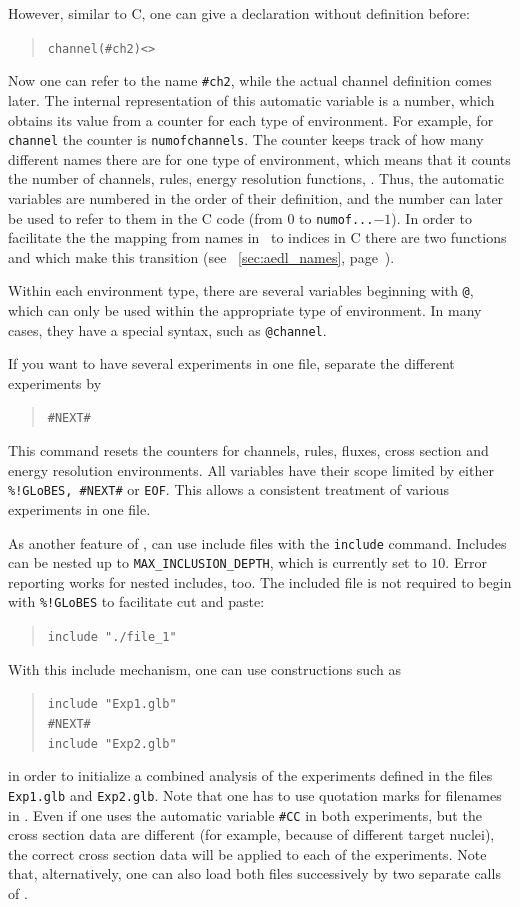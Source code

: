 However, similar to C, one can give a declaration without definition before:
\begin{quote}
{\tt    channel(\#ch2)<>}
\end{quote}
Now one can refer to the name {\tt \#ch2}, while the actual channel definition comes later. The internal representation of this automatic
variable is a number, which obtains its value from a counter for each type of environment. For example, for {\tt channel} the counter is {\tt numofchannels}. The counter keeps track of how many different names 
there are for one type of environment, which means that it counts the number of channels, rules, energy resolution functions, \etc . Thus, the automatic
variables are numbered in the order of their definition, and the number
can later be used to refer to them in the C code (from $0$ to {\tt numof...}$-1$). In order to facilitate the the mapping from names in \AEDL\ to indices
in C there are two functions  and  which
make this transition (see \Sec~\ref{sec:aedl_names}, 
page~\pageref{sec:aedl_names}).


Within each environment type, there are several 
variables beginning with {\tt @}, which can only be used within the 
appropriate type of environment. In many cases, 
they have a special syntax, such as {\tt @channel}.

If you want to have several experiments in one file, separate the different
 experiments by 
\begin{quote}
{\tt    \#NEXT\#}
\end{quote}
This command resets the counters for channels, rules, fluxes, cross section 
and energy resolution environments. All variables have their scope limited 
by either {\tt \%!GLoBES, \#NEXT\#} or {\tt EOF}.  This allows 
a consistent treatment of various experiments in one file.

As another feature of \AEDL , can use include files with the {\tt include} command. Includes can be nested up to {\tt MAX\_INCLUSION\_DEPTH}, which is currently set to $10$. Error reporting works 
 for nested includes, too. The included file is not required to begin 
 with {\tt \%!GLoBES} to facilitate cut and paste:
\begin{quote}
{\tt include "./file\_1"}
\end{quote}
With this include mechanism, one can use constructions such as 
\begin{quote}
{\tt    include  "Exp1.glb"\\
        \#NEXT\#\\
        include   "Exp2.glb"
}
\end{quote}
in order to initialize a combined analysis of the experiments defined in the files {\tt Exp1.glb} and {\tt Exp2.glb}. Note that one has 
to use quotation marks for filenames in \AEDL.
Even if one uses the
automatic variable {\tt \#CC} in both experiments, 
but the cross section data are different (for example, because of different target nuclei), the correct 
cross section data will be applied to each of the experiments. 
Note that, alternatively, one can 
also load both files successively by two separate calls of 
. 

